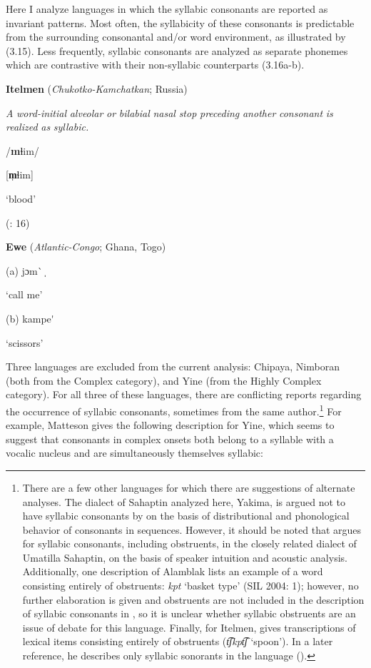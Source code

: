   Here I analyze languages in which the syllabic consonants are reported as invariant patterns. Most often, the syllabicity of these consonants is predictable from the surrounding consonantal and/or word environment, as illustrated by (3.15). Less frequently, syllabic consonants are analyzed as separate phonemes which are contrastive with their non-syllabic counterparts (3.16a-b).

\ea\label{ex:(3.15)}
  \textbf{Itelmen} (\textit{Chukotko-Kamchatkan}; Russia)

\textit{A} \textit{word-initial} \textit{alveolar} \textit{or} \textit{bilabial} \textit{nasal} \textit{stop} \textit{preceding} \textit{another} \textit{consonant} \textit{is} \textit{realized} \textit{as} \textit{syllabic.}

/\textbf{m}ɬim/

[\textbf{m̩}ɬim]

‘blood’

(\citealt{GeorgVolodin1999}: 16)
\z

\ea\label{ex:(3.16)}
  \textbf{Ewe} (\textit{Atlantic-Congo}; Ghana, Togo)

(a)   jɔm\`{} ̩

  ‘call me’

(b)  kampe\'{} 

  ‘scissors’

\citep[38]{Ameka1991}

\z

  Three languages are excluded from the current analysis: Chipaya, Nimboran (both from the Complex category), and Yine (from the Highly Complex category). For all three of these languages, there are conflicting reports regarding the occurrence of syllabic consonants, sometimes from the same author.\footnote{ \textrm{There are a few other languages for which there are suggestions of alternate analyses. The dialect of Sahaptin analyzed here, Yakima, is argued not to have syllabic consonants by \citet{HargusBeavert2006} on the basis of distributional and phonological behavior of consonants in sequences. However, it should be noted that \citet{Minthorn2005} argues for syllabic consonants, including obstruents, in the closely related dialect of Umatilla Sahaptin, on the basis of speaker intuition and acoustic analysis. Additionally, one description of Alamblak lists an example of a word consisting entirely of obstruents:} \textrm{\textit{kpt}} \textrm{‘basket type’ (SIL 2004: 1); however, no further elaboration is given and obstruents are not included in the description of syllabic consonants in \citet{Bruce1984}, so it is unclear whether syllabic obstruents are an issue of debate for this language. Finally, for Itelmen, \citet[42]{Volodin1976} gives transcriptions of lexical items consisting entirely of obstruents (}\textrm{\textit{t͡ʃkpt͡ʃ} }\textrm{‘spoon’). In a later reference, he describes only syllabic sonorants in the language (\citealt{GeorgVolodin1999}).}} For example, Matteson gives the following description for Yine, which seems to suggest that consonants in complex onsets both belong to a syllable with a vocalic nucleus and are simultaneously themselves syllabic:

